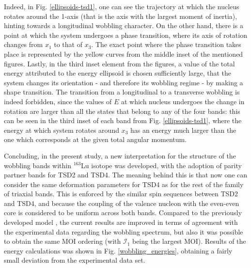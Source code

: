 \documentclass[%
 reprint,
 amsmath,
 amssymb,
 aps,
 floatfix,
]{revtex4-2}
\begin{document}
Indeed, in Fig. \ref{ellipsoids-tsd1}, one can see the trajectory at which the nucleus rotates around the 1-axis (that is the axis with the largest moment of inertia), hinting towards a longitudinal wobbling character. On the other hand, there is a point at which the system undergoes a phase transition, where its axis of rotation changes from $x_1$ to that of $x_3$. The exact point where the phase transition takes place is represented by the yellow curves from the middle inset of the mentioned figures. Lastly, in the third inset element from the figures, a value of the total energy attributed to the energy ellipsoid is chosen sufficiently large, that the system changes its orientation - and therefore its wobbling regime - by making a shape transition. The transition from a longitudinal to a transverse wobbling is indeed forbidden, since the values of $E$ at which nucleus undergoes the change in rotation are larger than all the states that belong to any of the four bands: this can be seen in the third inset of each band from Fig. \ref{ellipsoids-tsd1}, where the energy at which system rotates around $x_3$ has an energy much larger than the one which corresponds at the given total angular momentum.


Concluding, in the present study, a new interpretation for the structure of the wobbling bands within $^{163}$Lu isotope was developed, with the adoption of parity partner bands for TSD2 and TSD4. The meaning behind this is that now one can consider the same deformation parameters for TSD4 as for the rest of the family of triaxial bands. This is enforced by the similar spin sequences between TSD2 and TSD4, and because the coupling of the valence nucleon with the even-even core is considered to be uniform across both bands. Compared to the previously developed model \cite{raduta2020new}, the current results are improved in terms of agreement with the experimental data regarding the wobbling spectrum, but also it was possible to obtain the same MOI ordering (with $\mathcal{I}_1$ being the largest MOI). Results of the energy calculations was shown in Fig. \ref{wobbling_energies}, obtaining a fairly small deviation from the experimental data set.
\end{document}
